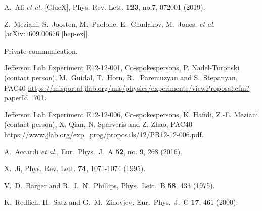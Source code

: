 \documentclass[prd,amsmath,%
twocolumn,floatfix,amssymb, preprintnumbers, linenumbers,nofootinbib, superscriptaddress]{revtex4}
\begin{document}
\begin{thebibliography}{99}
A.~Ali \textit{et al.} [GlueX],
Phys. Rev. Lett. \textbf{123}, no.7, 072001 (2019). 

Z.~Meziani, S.~Joosten, M.~Paolone, E.~Chudakov, M.~Jones, {\it et al.}
[arXiv:1609.00676 [hep-ex]].

Private communication.

Jefferson Lab Experiment E12-12-001, Co-spokespersons, P. Nadel-Turonski (contact person),  M.~Guidal, T.~Horn, R. ~Paremuzyan and S.~Stepanyan, PAC40 \url{https://misportal.jlab.org/mis/physics/experiments/viewProposal.cfm?paperId=701}.

Jefferson Lab Experiment E12-12-006, Co-spokespersons, K. Hafidi, Z.-E. Meziani (contact person), X. Qian, N. Sparveris and Z. Zhao, PAC40 \url{https://www.jlab.org/exp_prog/proposals/12/PR12-12-006.pdf}.

  A.~Accardi {\it et al.},
  Eur.\ Phys.\ J.\ A {\bf 52}, no. 9, 268 (2016).

X.~Ji,
Phys. Rev. Lett. \textbf{74}, 1071-1074 (1995). 

  

  V.~D.~Barger and R.~J.~N.~Phillips,
  Phys.\ Lett.\ B {\bf 58}, 433 (1975).
  

  K.~Redlich, H.~Satz and G.~M.~Zinovjev,
  Eur.\ Phys.\ J.\ C {\bf 17}, 461 (2000).


\end{thebibliography}
\end{document}
